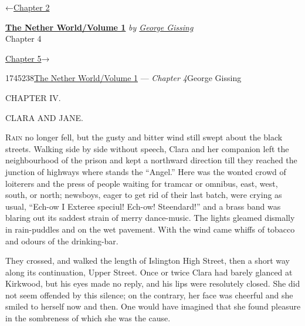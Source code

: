 \hypertarget{headerContainer}{}
\hypertarget{navigationHeader}{}
\protect\hypertarget{headerprevious}{}{←\href{/wiki/The_Nether_World/Volume_1/Chapter_2}{Chapter
2}}

\textbf{\protect\hypertarget{header_title_text}{}{\href{/w/index.php?title=The_Nether_World/Volume_1\&action=edit\&redlink=1}{The
Nether World/Volume 1}}} \emph{by
\href{/wiki/Author:George_Gissing}{\protect\hypertarget{header_author_text}{}{{George
Gissing}}}}\\
\protect\hypertarget{header_section_text}{}{Chapter 4}

\protect\hypertarget{headernext}{}{\href{/wiki/The_Nether_World/Volume_1/Chapter_5}{Chapter
5}→}

\hypertarget{navigationNotes}{}

\hypertarget{ws-data}{}
\protect\hypertarget{ws-article-id}{}{1745238}\protect\hypertarget{ws-title}{}{\href{/w/index.php?title=The_Nether_World/Volume_1\&action=edit\&redlink=1}{The
Nether World/Volume 1} --- \emph{Chapter
4}}\protect\hypertarget{ws-author}{}{George Gissing}

{\protect\hypertarget{71}{}{}}

{CHAPTER IV.}

CLARA AND JANE.

\textsc{Rain} no longer fell, but the gusty and bitter wind still swept
about the black streets. Walking side by side without speech, Clara and
her companion left the neighbourhood of the prison and kept a northward
direction till they reached the junction of highways where stands the
``Angel.'' Here was the wonted crowd of loiterers and the press of
people waiting for tramcar or omnibus, east, west, south, or north;
newsboys, eager to get rid of their last batch, were crying as usual,
``Ech-ow I Exteree speciul! Ech-ow! Steendard!'' and a brass band was
blaring out its saddest strain of merry dance-music. The lights gleamed
dismally in rain-puddles and on the wet pavement. With the wind
{\protect\hypertarget{72}{}{}}came whiffs of tobacco and odours of the
drinking-bar.

They crossed, and walked the length of Islington High Street, then a
short way along its continuation, Upper Street. Once or twice Clara had
barely glanced at Kirkwood, but his eyes made no reply, and his lips
were resolutely closed. She did not seem offended by this silence; on
the contrary, her face was cheerful and she smiled to herself now and
then. One would have imagined that she found pleasure in the sombreness
of which she was the cause.

